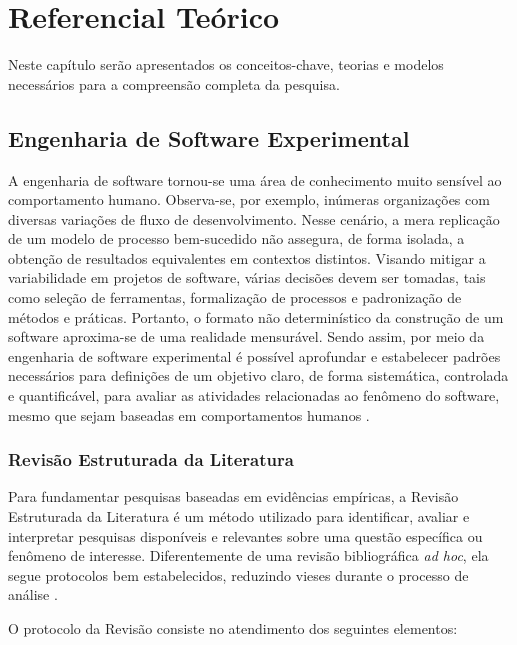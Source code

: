 \chapter[Referencial Teórico]{Referencial Teórico}

Neste capítulo serão apresentados os conceitos-chave, teorias e modelos necessários para a compreensão completa da pesquisa.


\section{Engenharia de Software Experimental}

A engenharia de software tornou-se uma área de conhecimento muito sensível ao comportamento humano. Observa-se, por exemplo, inúmeras organizações com diversas variações de fluxo de desenvolvimento. Nesse cenário, a mera replicação de um modelo de processo bem-sucedido não assegura, de forma isolada, a obtenção de resultados equivalentes em contextos distintos. Visando mitigar a variabilidade em projetos de software, várias decisões devem ser tomadas, tais como seleção de ferramentas, formalização de processos e padronização de métodos e práticas. Portanto, o formato não determinístico da construção de um software aproxima-se de uma realidade mensurável. Sendo assim, por meio da engenharia de software experimental é possível aprofundar e estabelecer padrões necessários para definições de um objetivo claro, de forma sistemática, controlada e quantificável, para avaliar as atividades relacionadas ao fenômeno do software, mesmo que sejam baseadas em comportamentos humanos \cite{wohlin2024experimentation}.


\subsection{Revisão Estruturada da Literatura}

Para fundamentar pesquisas baseadas em evidências empíricas, a Revisão Estruturada da Literatura é um método utilizado para identificar, avaliar e interpretar pesquisas disponíveis e relevantes sobre uma questão específica ou fenômeno de interesse. Diferentemente de uma revisão bibliográfica \textit{ad hoc}, ela segue protocolos bem estabelecidos, reduzindo vieses durante o processo de análise \cite{wohlin2024experimentation}.

O protocolo da Revisão consiste no atendimento dos seguintes elementos:

